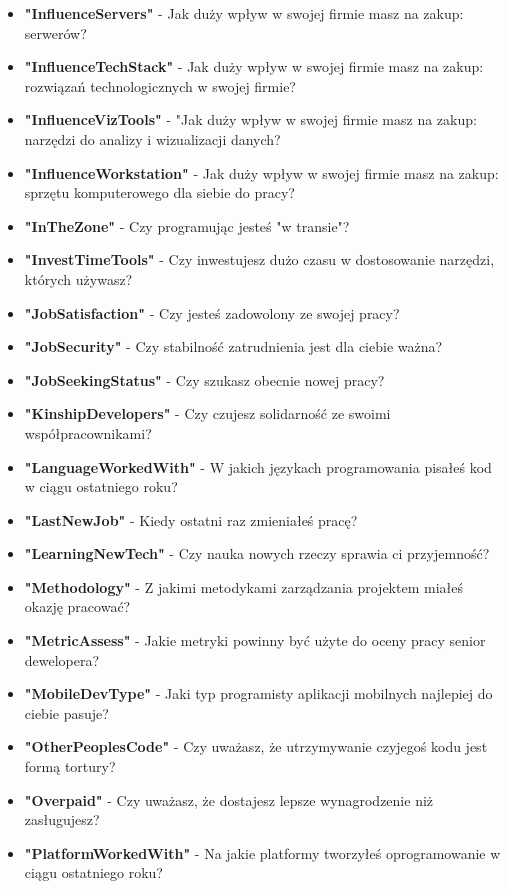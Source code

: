 \begin{appendices}
\begin{itemize}
        \item \textbf{"InfluenceServers"} - Jak duży wpływ w swojej firmie masz na zakup: serwerów?
        \item \textbf{"InfluenceTechStack"} - Jak duży wpływ w swojej firmie masz na zakup: rozwiązań technologicznych w swojej firmie?
        \item \textbf{"InfluenceVizTools"} - "Jak duży wpływ w swojej firmie masz na zakup: narzędzi do analizy i wizualizacji danych?
        \item \textbf{"InfluenceWorkstation"} - Jak duży wpływ w swojej firmie masz na zakup: sprzętu komputerowego dla siebie do pracy?
        \item \textbf{"InTheZone"} - Czy programując jesteś "w transie"?
        \item \textbf{"InvestTimeTools"} - Czy inwestujesz dużo czasu w dostosowanie narzędzi, których używasz?
        \item \textbf{"JobSatisfaction"} - Czy jesteś zadowolony ze swojej pracy?
        \item \textbf{"JobSecurity"} - Czy stabilność zatrudnienia jest dla ciebie ważna?
        \item \textbf{"JobSeekingStatus"} - Czy szukasz obecnie nowej pracy?
        \item \textbf{"KinshipDevelopers"} - Czy czujesz solidarność ze swoimi współpracownikami?
        \item \textbf{"LanguageWorkedWith"} - W jakich językach programowania pisałeś kod w ciągu ostatniego roku?
        \item \textbf{"LastNewJob"} - Kiedy ostatni raz zmieniałeś pracę?
        \item \textbf{"LearningNewTech"} - Czy nauka nowych rzeczy sprawia ci przyjemność?
        \item \textbf{"Methodology"} - Z jakimi metodykami zarządzania projektem miałeś okazję pracować?
        \item \textbf{"MetricAssess"} - Jakie metryki powinny być użyte do oceny pracy senior dewelopera?
        \item \textbf{"MobileDevType"} - Jaki typ programisty aplikacji mobilnych najlepiej do ciebie pasuje?
        \item \textbf{"OtherPeoplesCode"} - Czy uważasz, że utrzymywanie czyjegoś kodu jest formą tortury?
        \item \textbf{"Overpaid"} - Czy uważasz, że dostajesz lepsze wynagrodzenie niż zasługujesz?
        \item \textbf{"PlatformWorkedWith"} - Na jakie platformy tworzyłeś oprogramowanie w ciągu ostatniego roku?

\end{itemize}
\end{appendices}
